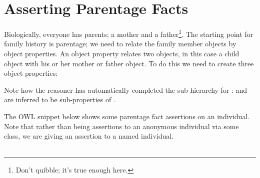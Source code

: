\section{Asserting Parentage Facts}



Biologically, everyone has parents; a mother and a father\footnote{Don't quibble; it's true enough here.}. The starting point for family history is parentage; we need to relate the family member objects by object properties. An object property relates two objects, in this case a child object with his or her mother or father object. To do this we need to create three object properties:


Note how the reasoner has automatically completed the sub-hierarchy for :  and  are inferred to be sub-properties of . 

The OWL snippet below shows some parentage fact assertions on an individual. Note that rather than being assertions to an anonymous individual via some class, we are giving an assertion to a named individual. 
\\\\

